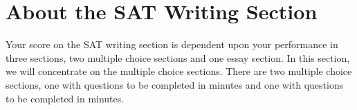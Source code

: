 \section{About the SAT Writing Section}

Your score on the SAT writing section is dependent upon your performance in three sections, two multiple choice sections and one essay section. In this section, we will concentrate on the multiple choice sections. There are two multiple choice sections, one with \underline{\hspace{2in}} questions to be completed in \underline{\hspace{2in}} minutes and one with \underline{\hspace{2in}} questions to be completed in \underline{\hspace{2in}} minutes.
